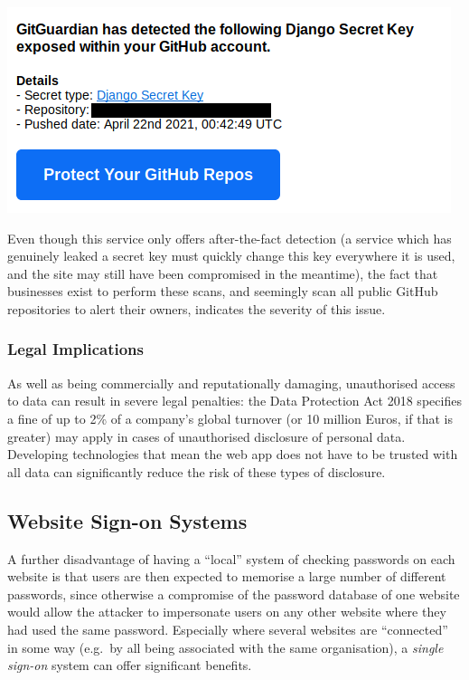 \documentclass{article}
\begin{document}
\includegraphics[scale=0.5]{01-gitguardian.png}

Even though this service only offers after-the-fact detection (a service which has genuinely leaked a secret key must quickly change this key everywhere it is used, and the site may still have been compromised in the meantime), the fact that businesses exist to perform these scans, and seemingly scan all public GitHub repositories to alert their owners, indicates the severity of this issue.

\subsubsection{Legal Implications}
As well as being commercially and reputationally damaging, unauthorised access to data can result in severe legal penalties: the Data Protection Act 2018 specifies a fine of up to 2\% of a company's global turnover (or 10 million Euros, if that is greater) may apply in cases of unauthorised disclosure of personal data\cite{GDPR}. Developing technologies that mean the web app does not have to be trusted with all data can significantly reduce the risk of these types of disclosure.

\subsection{Website Sign-on Systems}
A further disadvantage of having a ``local'' system of checking passwords on each website is that users are then expected to memorise a large number of different passwords, since otherwise a compromise of the password database of one website would allow the attacker to impersonate users on any other website where they had used the same password. Especially where several websites are ``connected'' in some way (e.g.\ by all being associated with the same organisation), a \textit{single sign-on} system can offer significant benefits.
\end{document}

